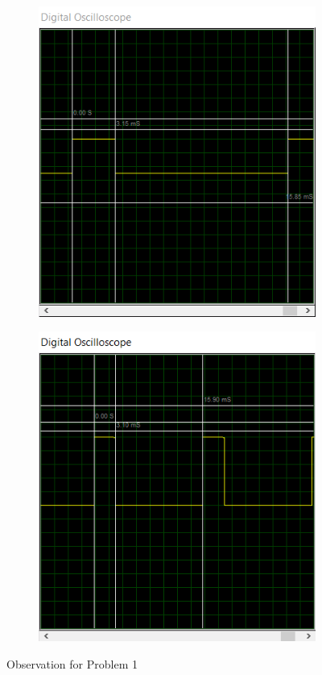 \documentclass{lab_sheet}
\begin{document}
\begin{figure}[H]
\begin{subfigure}{.5\textwidth}
            \caption{}
            \label{fig:prob1_b}
            \end{subfigure}
            \newline
            \begin{subfigure}{.5\textwidth}
                \centering
                \includegraphics[width=.8\linewidth,frame]{../Figures/1c.png}
                \caption{}
                \label{fig:prob1_c}
                \end{subfigure}
                \begin{subfigure}{.5\textwidth}
                    \centering
                    \includegraphics[width=.8\linewidth,frame]{../Figures/1d.png}
                    \caption{}
                    \label{fig:prob1_d}
                    \end{subfigure}
                    \caption{Observation for Problem 1}
                    \label{fig:prob1}
    \end{figure}
\end{document}
